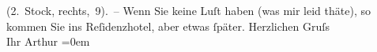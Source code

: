 \begin{ledgroupsized}[t]{13cm}
                    (2. Stock,  rechts, 9). – Wenn Sie keine
                        {\pb}Luſt haben (was mir leid thäte), so kommen Sie
                    ins Reſidenzhotel, aber etwas ſpäter.\pend
           \pstart
           Herzlichen Gruſs{\\[\baselineskip]}Ihr \spacefill\mbox{Arthur}\pend
           \leftskip=0em{}\endnumbering{}\end{ledgroupsized}  \newcommand{\dateiname}{L00797}\newcommand{\titel}{Arthur Schnitzler an Hugo von Hofmannsthal, [29. 5. 1898?]}\newcommand{\editorInnen}{Martin Anton Müller und Gerd-Hermann Susen}
            \footnotesize
\begin{ledgroupsized}[t]{11.5cm}
\end{ledgroupsized}
         
      